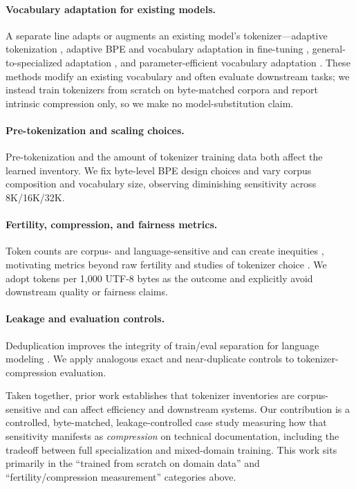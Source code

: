 \paragraph{Vocabulary adaptation for existing models.}
A separate line adapts or augments an existing model's tokenizer---adaptive
tokenization \citep{sachidananda2021adaptive}, adaptive BPE and vocabulary
adaptation in fine-tuning \citep{balde2024adaptivebpe,herold2025vocabulary},
general-to-specialized adaptation \citep{liyanage2026adaptbpe}, and
parameter-efficient vocabulary adaptation \citep{balde2026learning}. These methods
modify an existing vocabulary and often evaluate downstream tasks; we instead
train tokenizers from scratch on byte-matched corpora and report intrinsic
compression only, so we make no model-substitution claim.

\paragraph{Pre-tokenization and scaling choices.}
Pre-tokenization \citep{kudo2018sentencepiece,dagan2024tokenizer} and the amount of
tokenizer training data \citep{reddy2025diminishing} both affect the learned
inventory. We fix byte-level BPE design choices and vary corpus composition and
vocabulary size, observing diminishing sensitivity across 8K/16K/32K.

\paragraph{Fertility, compression, and fairness metrics.}
Token counts are corpus- and language-sensitive and can create inequities
\citep{petrov2023unfairness}, motivating metrics beyond raw fertility
\citep{nayeem2025strr} and studies of tokenizer choice
\citep{ali2024tokenizerchoice,rust2021tokenizer}. We adopt tokens per 1{,}000
UTF-8 bytes as the outcome and explicitly avoid downstream quality or fairness
claims.

\paragraph{Leakage and evaluation controls.}
Deduplication improves the integrity of train/eval separation for language
modeling \citep{lee2022dedup}. We apply analogous exact and near-duplicate
controls to tokenizer-compression evaluation.

\medskip
Taken together, prior work establishes that tokenizer inventories are
corpus-sensitive and can affect efficiency and downstream systems. Our
contribution is a controlled, byte-matched, leakage-controlled case study
measuring how that sensitivity manifests as \emph{compression} on technical
documentation, including the tradeoff between full specialization and mixed-domain
training. This work sits primarily in the ``trained from scratch on domain data''
and ``fertility/compression measurement'' categories above.
